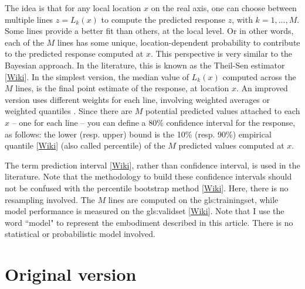 \documentclass[oneside,10pt]{book}
\begin{document}
The idea is that for any local location $x$ on the real axis, one can choose between multiple lines $z=L_k(x)$ to compute the predicted response $z$, with
$k=1,\dots,M$. Some lines provide a better fit than others, at the local level. Or in other words, each of the $M$ lines has some unique, location-dependent
probability to contribute to the predicted response computed at $x$. This perspective is very similar to the Bayesian approach.  In the literature, this is known as the
\textcolor{index}{Theil-Sen estimator} [\href{https://mltblog.com/3LomHbJ}{Wiki}]. In the simplest version, the median value of $L_k(x)$ computed across the $M$ lines, is the final
point estimate of the response, at location $x$. An improved version uses different weights for each line, involving weighted averages or
\textcolor{index}{weighted quantiles} \cite{wpnumpy}.
Since there are $M$ potential predicted values attached to each $x$ -- one for each line -- you can define
a 80\% confidence interval for the response, as follows: the lower (resp. upper) bound is the 10\% (resp. 90\%) \textcolor{index}{empirical quantile}
[\href{https://en.wikipedia.org/wiki/Quantile}{Wiki}] (also called percentile) of the $M$ predicted values computed at $x$.

The term
\textcolor{index}{prediction interval} [\href{https://en.wikipedia.org/wiki/Prediction_interval}{Wiki}], rather than confidence interval, is used in the literature.
Note that the methodology to build these confidence intervals should not be confused with the \textcolor{index}{percentile bootstrap method} [\href{https://stats.stackexchange.com/questions/355781/is-it-true-that-the-percentile-bootstrap-should-never-be-used}{Wiki}]. Here, there is no resampling involved. The $M$ lines are computed on the \gls{gls:trainingset}, while model performance is measured on the
\gls{gls:validset} [\href{https://en.wikipedia.org/wiki/Training,_validation,_and_test_data_sets}{Wiki}]. Note that I use the word ``model" to represent the embodiment described in this article. There is no
statistical or probabilistic model involved.

\section{Original version}\label{fuzzy1}
\end{document}
